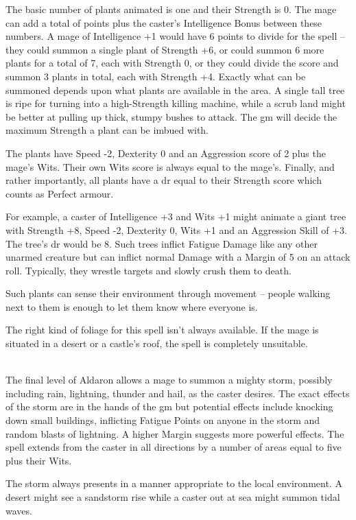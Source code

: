 \begin{multicols}{2}
The basic number of plants animated is one and their Strength is 0. The mage can add a total of  points plus the caster's Intelligence Bonus between these numbers. A mage of Intelligence +1 would have 6 points to divide for the spell -- they could summon a single plant of Strength +6, or could summon 6 more plants for a total of 7, each with Strength 0, or they could divide the score and summon 3 plants in total, each with Strength +4. Exactly what can be summoned depends upon what plants are available in the area. A single tall tree is ripe for turning into a high-Strength killing machine, while a scrub land might be better at pulling up thick, stumpy bushes to attack. The \gls{gm} will decide the maximum Strength a plant can be imbued with.

The plants have Speed -2, Dexterity 0 and an Aggression score of 2 plus the mage's Wits. Their own Wits score is always equal to the mage's. Finally, and rather importantly, all plants have a \gls{dr} equal to their Strength score which counts as Perfect armour.

For example, a caster of Intelligence +3 and Wits +1 might animate a giant tree with Strength +8, Speed -2, Dexterity 0, Wits +1 and an Aggression Skill of +3. The tree's \gls{dr} would be 8. Such trees inflict Fatigue Damage like any other unarmed creature but can inflict normal Damage with a Margin of 5 on an attack roll. Typically, they wrestle targets and slowly crush them to death.

Such plants can sense their environment through movement -- people walking next to them is enough to let them know where everyone is.

The right kind of foliage for this spell isn't always available. If the mage is situated in a desert or a castle's roof, the spell is completely unsuitable.

\\
The final level of Aldaron allows a mage to summon a mighty storm, possibly including rain, lightning, thunder and hail, as the caster desires. The exact effects of the storm are in the hands of the \gls{gm} but potential effects include knocking down small buildings, inflicting Fatigue Points on anyone in the storm and random blasts of lightning. A higher Margin suggests more powerful effects. The spell extends from the caster in all directions by a number of areas equal to five plus their Wits.

The storm always presents in a manner appropriate to the local environment. A desert might see a sandstorm rise while a caster out at sea might summon tidal waves.

\end{multicols}

